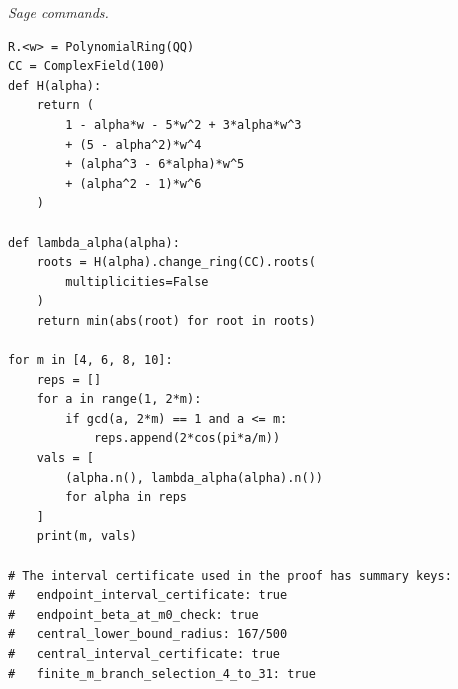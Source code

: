\begin{enumerate}[label=(\alph*)]
    \medskip
    \noindent\textit{Sage commands.}
\begin{verbatim}
R.<w> = PolynomialRing(QQ)
CC = ComplexField(100)
def H(alpha):
    return (
        1 - alpha*w - 5*w^2 + 3*alpha*w^3
        + (5 - alpha^2)*w^4
        + (alpha^3 - 6*alpha)*w^5
        + (alpha^2 - 1)*w^6
    )

def lambda_alpha(alpha):
    roots = H(alpha).change_ring(CC).roots(
        multiplicities=False
    )
    return min(abs(root) for root in roots)

for m in [4, 6, 8, 10]:
    reps = []
    for a in range(1, 2*m):
        if gcd(a, 2*m) == 1 and a <= m:
            reps.append(2*cos(pi*a/m))
    vals = [
        (alpha.n(), lambda_alpha(alpha).n())
        for alpha in reps
    ]
    print(m, vals)

# The interval certificate used in the proof has summary keys:
#   endpoint_interval_certificate: true
#   endpoint_beta_at_m0_check: true
#   central_lower_bound_radius: 167/500
#   central_interval_certificate: true
#   finite_m_branch_selection_4_to_31: true
\end{verbatim}


\end{enumerate}
